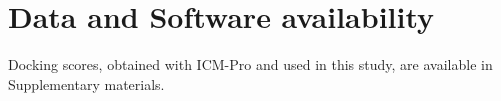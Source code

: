 \section{Data and Software availability}
Docking scores, obtained with ICM-Pro and used in this study, are available in Supplementary materials.



